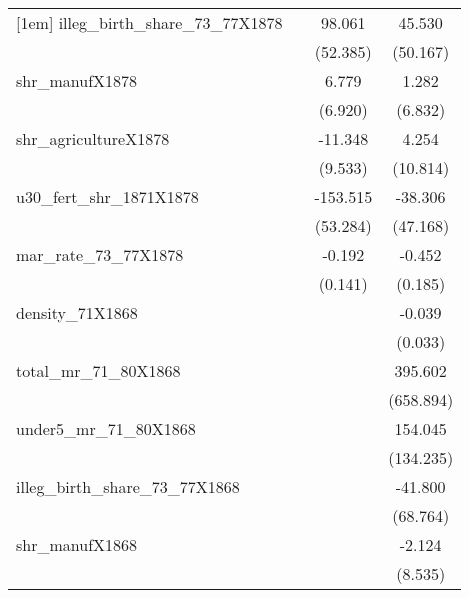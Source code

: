 {\begin{tabular}{l*{3}{c}}
[1em]
illeg\_birth\_share\_73\_77X1878&                     &      98.061\sym{*}  &      45.530         \\
                    &                     &    (52.385)         &    (50.167)         \\
[1em]
shr\_manufX1878      &                     &       6.779         &       1.282         \\
                    &                     &     (6.920)         &     (6.832)         \\
[1em]
shr\_agricultureX1878&                     &     -11.348         &       4.254         \\
                    &                     &     (9.533)         &    (10.814)         \\
[1em]
u30\_fert\_shr\_1871X1878&                     &    -153.515\sym{***}&     -38.306         \\
                    &                     &    (53.284)         &    (47.168)         \\
[1em]
mar\_rate\_73\_77X1878 &                     &      -0.192         &      -0.452\sym{**} \\
                    &                     &     (0.141)         &     (0.185)         \\
[1em]
density\_71X1868     &                     &                     &      -0.039         \\
                    &                     &                     &     (0.033)         \\
[1em]
total\_mr\_71\_80X1868 &                     &                     &     395.602         \\
                    &                     &                     &   (658.894)         \\
[1em]
under5\_mr\_71\_80X1868&                     &                     &     154.045         \\
                    &                     &                     &   (134.235)         \\
[1em]
illeg\_birth\_share\_73\_77X1868&                     &                     &     -41.800         \\
                    &                     &                     &    (68.764)         \\
[1em]
shr\_manufX1868      &                     &                     &      -2.124         \\
                    &                     &                     &     (8.535)         \\

\end{tabular}}

